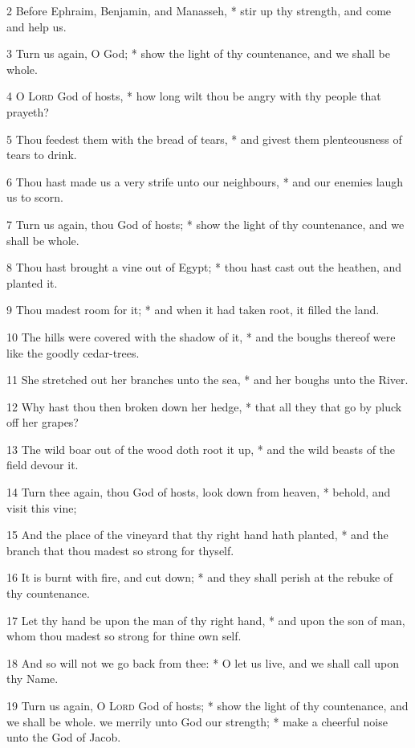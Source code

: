 2 Before Ephraim, Benjamin, and Manasseh, * stir up thy strength, and come and help us.\par
3 Turn us again, O God; * show the light of thy countenance, and we shall be whole.\par
4 O {\textsc{Lord}} God of hosts, * how long wilt thou be angry with thy people that prayeth?\par
5 Thou feedest them with the bread of tears, * and givest them plenteousness of tears to drink.\par
6 Thou hast made us a very strife unto our neighbours, * and our enemies laugh us to scorn.\par
7 Turn us again, thou God of hosts; * show the light of thy countenance, and we shall be whole.\par
8 Thou hast brought a vine out of Egypt; * thou hast cast out the heathen, and planted it.\par
9 Thou madest room for it; * and when it had taken root, it filled the land.\par
10 The hills were covered with the shadow of it, * and the boughs thereof were like the goodly cedar-trees.\par
11 She stretched out her branches unto the sea, * and her boughs unto the River.\par
12 Why hast thou then broken down her hedge, * that all they that go by pluck off her grapes?\par
13 The wild boar out of the wood doth root it up, * and the wild beasts of the field devour it.\par
14 Turn thee again, thou God of hosts, look down from heaven, * behold, and visit this vine;\par
15 And the place of the vineyard that thy right hand hath planted, * and the branch that thou madest so strong for thyself.\par
16 It is burnt with fire, and cut down; * and they shall perish at the rebuke of thy countenance.\par
17 Let thy hand be upon the man of thy right hand, * and upon the son of man, whom thou madest so strong for thine own self.\par
18 And so will not we go back from thee: * O let us live, and we shall call upon thy Name.\par
19 Turn us again, O {\textsc{Lord}} God of hosts; * show the light of thy countenance, and we shall be whole.
 we merrily unto God our strength; * make a cheerful noise unto the God of Jacob.\par
